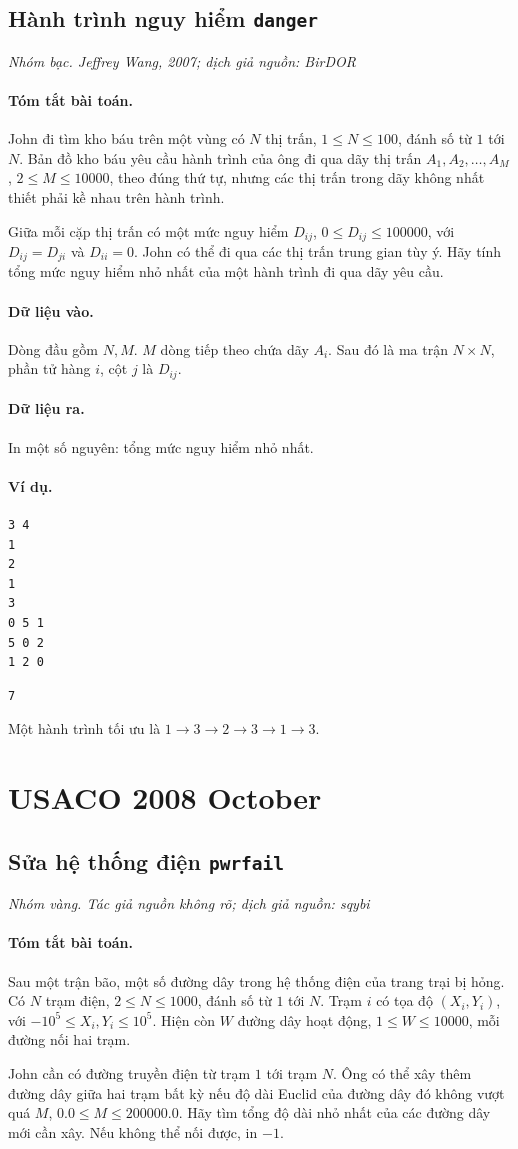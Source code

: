 \documentclass[11pt]{article}
\newcommand{\problem}[4]{%
  \subsection[#1 (#2)]{#1 \hfill {\normalsize\texttt{#2}}}%
  \noindent\textit{#3. #4}\par\smallskip
}
\newcommand{\iosec}[1]{\paragraph{#1}}
\begin{document}
\problem{Hành trình nguy hiểm}{danger}{Nhóm bạc}{Jeffrey Wang, 2007; dịch giả nguồn: BirDOR}

\iosec{Tóm tắt bài toán.}
John đi tìm kho báu trên một vùng có \(N\) thị trấn, \(1\le N\le 100\), đánh
số từ \(1\) tới \(N\). Bản đồ kho báu yêu cầu hành trình của ông đi qua dãy
thị trấn \(A_1,A_2,\ldots,A_M\), \(2\le M\le 10000\), theo đúng thứ tự, nhưng
các thị trấn trong dãy không nhất thiết phải kề nhau trên hành trình.

Giữa mỗi cặp thị trấn có một mức nguy hiểm \(D_{ij}\),
\(0\le D_{ij}\le 100000\), với \(D_{ij}=D_{ji}\) và \(D_{ii}=0\). John có thể
đi qua các thị trấn trung gian tùy ý. Hãy tính tổng mức nguy hiểm nhỏ nhất
của một hành trình đi qua dãy yêu cầu.

\iosec{Dữ liệu vào.}
Dòng đầu gồm \(N,M\). \(M\) dòng tiếp theo chứa dãy \(A_i\). Sau đó là ma
trận \(N\times N\), phần tử hàng \(i\), cột \(j\) là \(D_{ij}\).

\iosec{Dữ liệu ra.}
In một số nguyên: tổng mức nguy hiểm nhỏ nhất.

\iosec{Ví dụ.}
\begin{verbatim}
3 4
1
2
1
3
0 5 1
5 0 2
1 2 0
\end{verbatim}

\begin{verbatim}
7
\end{verbatim}

Một hành trình tối ưu là \(1\to3\to2\to3\to1\to3\).

\section{USACO 2008 October}

\problem{Sửa hệ thống điện}{pwrfail}{Nhóm vàng}{Tác giả nguồn không rõ; dịch giả nguồn: sqybi}

\iosec{Tóm tắt bài toán.}
Sau một trận bão, một số đường dây trong hệ thống điện của trang trại bị hỏng.
Có \(N\) trạm điện, \(2\le N\le 1000\), đánh số từ \(1\) tới \(N\). Trạm
\(i\) có tọa độ \((X_i,Y_i)\), với \(-10^5\le X_i,Y_i\le 10^5\). Hiện còn
\(W\) đường dây hoạt động, \(1\le W\le 10000\), mỗi đường nối hai trạm.

John cần có đường truyền điện từ trạm \(1\) tới trạm \(N\). Ông có thể xây
thêm đường dây giữa hai trạm bất kỳ nếu độ dài Euclid của đường dây đó không
vượt quá \(M\), \(0.0\le M\le 200000.0\). Hãy tìm tổng độ dài nhỏ nhất của
các đường dây mới cần xây. Nếu không thể nối được, in \(-1\).
\end{document}
